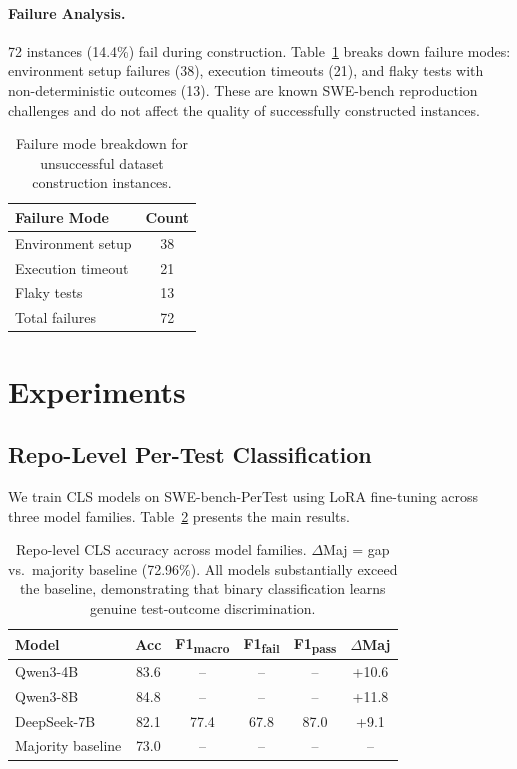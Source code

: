 \documentclass[11pt,a4paper]{article}
\begin{document}
\paragraph{Failure Analysis.}
72 instances (14.4\%) fail during construction.
Table~\ref{tab:dataset-failures} breaks down failure modes: environment setup failures (38), execution timeouts (21), and flaky tests with non-deterministic outcomes (13).
These are known SWE-bench reproduction challenges and do not affect the quality of successfully constructed instances.

\begin{table}[t]
\centering
\small
\begin{tabular}{lc}
\toprule
\textbf{Failure Mode} & \textbf{Count} \\
\midrule
Environment setup & 38 \\
Execution timeout & 21 \\
Flaky tests & 13 \\
\midrule
Total failures & 72 \\
\bottomrule
\end{tabular}
\caption{Failure mode breakdown for unsuccessful dataset construction instances.}
\label{tab:dataset-failures}
\end{table}

\section{Experiments}

\subsection{Repo-Level Per-Test Classification}
\label{sec:repo-cls}

We train CLS models on SWE-bench-PerTest using LoRA fine-tuning across three model families.
Table~\ref{tab:repo-cls} presents the main results.

\begin{table}[t]
\centering
\small
\begin{tabular}{lccccc}
\toprule
\textbf{Model} & \textbf{Acc} & \textbf{F1\textsubscript{macro}} & \textbf{F1\textsubscript{fail}} & \textbf{F1\textsubscript{pass}} & \textbf{$\Delta$Maj} \\
\midrule
Qwen3-4B & 83.6 & -- & -- & -- & +10.6 \\
Qwen3-8B & 84.8 & -- & -- & -- & +11.8 \\
DeepSeek-7B & 82.1 & 77.4 & 67.8 & 87.0 & +9.1 \\
\midrule
Majority baseline & 73.0 & -- & -- & -- & -- \\
\bottomrule
\end{tabular}
\caption{Repo-level CLS accuracy across model families. $\Delta$Maj = gap vs.\ majority baseline (72.96\%). All models substantially exceed the baseline, demonstrating that binary classification learns genuine test-outcome discrimination.}
\label{tab:repo-cls}
\end{table}
\end{document}
